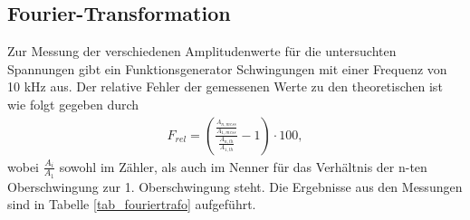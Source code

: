 \subsection{Fourier-Transformation}
Zur Messung der verschiedenen Amplitudenwerte für die untersuchten Spannungen gibt ein Funktionsgenerator Schwingungen mit einer
Frequenz von 10 kHz aus. Der relative Fehler der gemessenen Werte zu den theoretischen ist wie folgt gegeben durch
\begin{align}
 F_{rel}=\left (\frac{\frac{A_{n,mess}}{A_{1,mess}}}{\frac{A_{n,th}}{A_{1,th}}}-1\right)\cdot 100,
\end{align}
wobei $\frac{A_i}{A_1}$ sowohl im Zähler, als auch im Nenner für das Verhältnis der n-ten Oberschwingung zur 1. Oberschwingung steht.
Die Ergebnisse aus den Messungen sind in Tabelle \ref{tab_fouriertrafo} aufgeführt.

